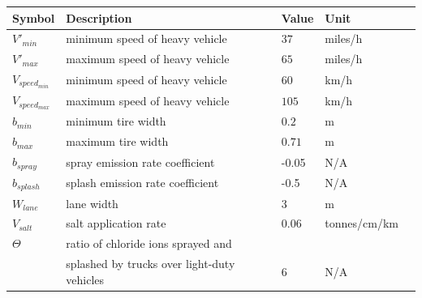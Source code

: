 \documentclass[12pt]{article}
\begin{document}
\begin{table}[!h]
  \caption{Auxiliary Constant} \label{TblConstants}
  \renewcommand{\arraystretch}{1.2}
\noindent \begin{longtable*}{l l l l c} 
  \toprule
 \textbf{Symbol} & \textbf{Description} & \textbf{Value} & \textbf{Unit}\\


  \midrule 
  $V'_{min}$ & minimum speed of heavy vehicle & $37$ & miles/h  
  \\
  $V'_{max}$ & maximum speed of heavy vehicle & $65$ & miles/h   
  \\
  $V_{speed_{min}}$ & minimum speed of heavy vehicle & $60$ & km/h   
  \\
  $V_{speed_{max}}$ & maximum speed of heavy vehicle & $105$ & km/h
  \\
  $b_{min}$ & minimum tire width & $0.2$ & m 
  \\
  $b_{max}$ & maximum tire width & $0.71$ & m 
  \\ 
  $b_{spray}$ & spray emission rate coefficient & -0.05 & N/A
  \\
  $b_{splash}$ & splash emission rate coefficient & -0.5 & N/A
  \\
  $W_{lane}$ & lane width & 3 & m
  \\  
  $V_{salt}$ & salt application rate & 0.06 & tonnes/cm/km
  \\
  $\Theta$ & ratio of chloride ions sprayed and  \\
  & splashed by trucks over light-duty vehicles& 6 & N/A
  \\  
  
  \bottomrule
\end{longtable*}
\end{table}


\newpage
\end{document}

